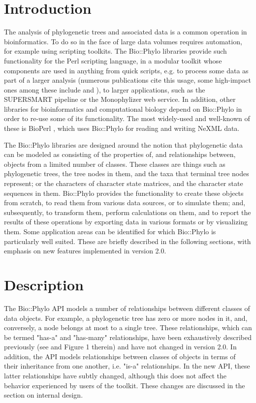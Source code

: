\documentclass{bioinfo}
\begin{document}
\section{Introduction}

The analysis of phylogenetic trees and associated data is a common operation in 
bioinformatics. To do so in the face of large data volumes requires automation, for 
example using scripting toolkits. The Bio::Phylo libraries \citep{Vos2011} provide such 
functionality for the Perl scripting language, in a modular toolkit whose components are 
used in anything from quick scripts, e.g. to process some data as part of a larger 
analysis (numerous publications cite this usage, some high-impact ones among these include 
\citet{Hayward2015} and \citet{Smet2013}), to larger applications, such as the SUPERSMART 
pipeline \citep{Antonelli2017} or the Monophylizer \citep{Mutanen2016} web service. In 
addition, other libraries for bioinformatics and computational biology depend on 
Bio::Phylo in order to re-use some of its functionality. The most widely-used and 
well-known of these is BioPerl \citep{Stajich2002}, which uses Bio::Phylo for reading and 
writing NeXML \citep{Vos2012} data. 

The Bio::Phylo libraries are designed around the notion that phylogenetic data can be 
modeled as consisting of the properties of, and relationships between, objects from a 
limited number of classes. These classes are things such as phylogenetic trees, the tree 
nodes in them, and the taxa that terminal tree nodes represent; or the characters of 
character state matrices, and the character state sequences in them. Bio::Phylo provides 
the functionality to create these objects from scratch, to read them from various data 
sources, or to simulate them; and, subsequently, to transform them, perform calculations 
on them, and to report the results of these operations by exporting data in various 
formats or by visualizing them. Some application areas can be identified for which 
Bio::Phylo is particularly well suited. These are briefly described in the following 
sections, with emphasis on new features implemented in version 2.0.

\section{Description}

The Bio::Phylo API models a number of relationships between different classes of data 
objects. For example, a phylogenetic tree has zero or more nodes in it, and, conversely, 
a node belongs at most to a single tree. These relationships, which can be termed "has-a" 
and "has-many" relationships, have been exhaustively described previously (see 
\citet{Vos2011} and Figure 1 therein) and have not changed in version 2.0. In addition, 
the API models relationships between classes of objects in terms of their inheritance from 
one another, i.e. "is-a" relationships. In the new API, these latter relationships have 
subtly changed, although this does not affect the behavior experienced by users of the 
toolkit. These changes are discussed in the section on internal design.
\end{document}
